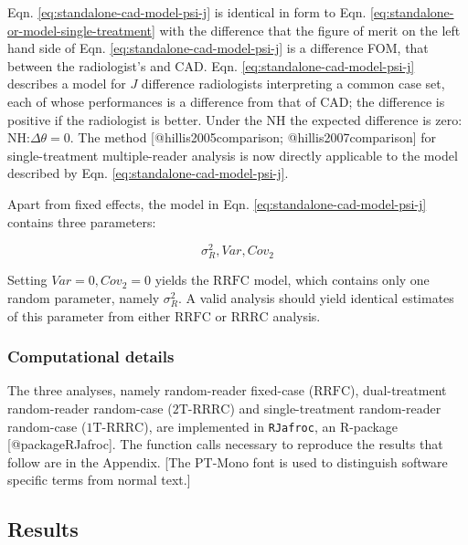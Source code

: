 \documentclass[
]{article}
\begin{document}
Eqn. \eqref{eq:standalone-cad-model-psi-j} is identical in form to Eqn. \eqref{eq:standalone-or-model-single-treatment} with the difference that the figure of merit on the left hand side of Eqn. \eqref{eq:standalone-cad-model-psi-j} is a difference FOM, that between the radiologist's and CAD. Eqn. \eqref{eq:standalone-cad-model-psi-j} describes a model for \(J\) difference radiologists interpreting a common case set, each of whose performances is a difference from that of CAD; the difference is positive if the radiologist is better. Under the NH the expected difference is zero: \(\text{NH:} \Delta \theta = 0\). The method {[}@hillis2005comparison; @hillis2007comparison{]} for single-treatment multiple-reader analysis is now directly applicable to the model described by Eqn. \eqref{eq:standalone-cad-model-psi-j}.

Apart from fixed effects, the model in Eqn. \eqref{eq:standalone-cad-model-psi-j} contains three parameters:

\begin{equation}
\sigma_R^2, Var, Cov_2
\label{eq:standalone-cad-parameter-simplified-model}
\end{equation}

Setting \(Var = 0, Cov_2 = 0\) yields the \(\text{RRFC}\) model, which contains only one random parameter, namely \(\sigma_R^2\). A valid analysis should yield identical estimates of this parameter from either \(\text{RRFC}\) or \(\text{RRRC}\) analysis.

\hypertarget{standalone-cad-radiologists-computational-details}{%
\subsubsection{Computational details}\label{standalone-cad-radiologists-computational-details}}

The three analyses, namely random-reader fixed-case (\(\text{RRFC}\)), dual-treatment random-reader random-case (\(\text{2T-RRRC}\)) and single-treatment random-reader random-case (\(\text{1T-RRRC}\)), are implemented in \texttt{RJafroc}, an R-package {[}@packageRJafroc{]}. The function calls necessary to reproduce the results that follow are in the Appendix. {[}The PT-Mono font is used to distinguish software specific terms from normal text.{]}

\hypertarget{standalone-cad-radiologists-results}{%
\subsection{Results}\label{standalone-cad-radiologists-results}}
\end{document}
